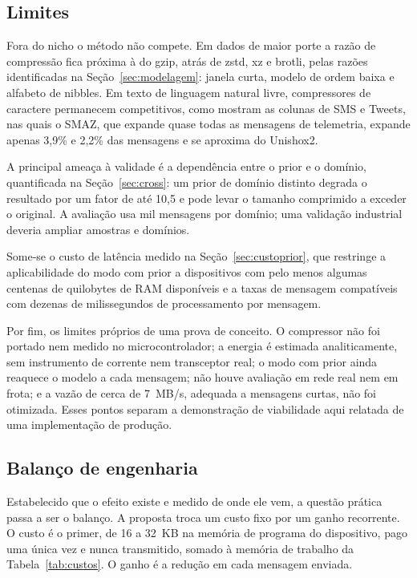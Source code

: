 \documentclass[12pt]{article}
\begin{document}
\subsection{Limites}

Fora do nicho o método não compete. Em dados de maior porte a razão de
compressão fica próxima à do gzip, atrás de zstd, xz e brotli, pelas razões
identificadas na Seção~\ref{sec:modelagem}: janela curta, modelo de ordem baixa
e alfabeto de nibbles. Em texto de linguagem natural livre, compressores de
caractere permanecem competitivos, como mostram as colunas de SMS e Tweets, nas
quais o SMAZ, que expande quase todas as mensagens de telemetria, expande apenas
3,9\% e 2,2\% das mensagens e se aproxima do Unishox2.

A principal ameaça à validade é a dependência entre o prior e o domínio,
quantificada na Seção~\ref{sec:cross}: um prior de domínio distinto degrada o
resultado por um fator de até 10,5 e pode levar o tamanho comprimido a exceder o
original. A avaliação usa mil mensagens por domínio; uma validação industrial
deveria ampliar amostras e domínios.

Some-se o custo de latência medido na Seção~\ref{sec:custoprior}, que restringe
a aplicabilidade do modo com prior a dispositivos com pelo menos algumas
centenas de quilobytes de RAM disponíveis e a taxas de mensagem compatíveis com
dezenas de milissegundos de processamento por mensagem.

Por fim, os limites próprios de uma prova de conceito. O compressor não foi
portado nem medido no microcontrolador; a energia é estimada analiticamente, sem
instrumento de corrente nem transceptor real; o modo com prior ainda reaquece o
modelo a cada mensagem; não houve avaliação em rede real nem em frota; e a vazão
de cerca de 7~MB/s, adequada a mensagens curtas, não foi otimizada. Esses pontos
separam a demonstração de viabilidade aqui relatada de uma implementação de
produção.

\subsection{Balanço de engenharia}

Estabelecido que o efeito existe e medido de onde ele vem, a questão prática
passa a ser o balanço. A proposta troca um custo fixo por um ganho recorrente. O
custo é o primer, de 16 a 32~KB na memória de programa do dispositivo, pago uma
única vez e nunca transmitido, somado à memória de trabalho da
Tabela~\ref{tab:custos}. O ganho é a redução em cada mensagem enviada.
\end{document}
